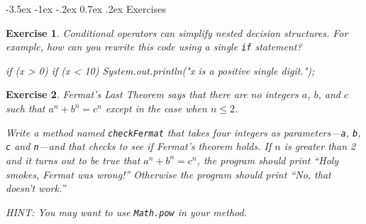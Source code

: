 \documentclass[12pt]{book}
\makeatletter
\theoremstyle{exercise}
\newtheorem{exercise}{Exercise}[chapter]
\newcommand{\java}[1]{\verb"#1"}
\renewcommand{\section}{\@startsection{section}{1}{\z@}%
    {-3.5ex \@plus -1ex \@minus -.2ex}%
    {0.7ex \@plus.2ex}%
    {\normalfont\Large\bfseries}}
\newcommand{\java}[1]{\lstinline{#1}} %
\makeatother
\begin{document}
\section{Exercises}


\begin{exercise}

Conditional operators can simplify nested decision structures.
For example, how can you rewrite this code using a single \java{if} statement?

\begin{code}
    if (x > 0) {
        if (x < 10) {
            System.out.println("x is a positive single digit.");
        }
    }
\end{code}

\end{exercise}


\begin{exercise}

Fermat's Last Theorem says that there are no integers $a$, $b$, and $c$ such that $a^n + b^n = c^n$ except in the case when $n \leq 2$.

Write a method named \java{checkFermat} that takes four integers as parameters---\java{a}, \java{b}, \java{c} and \java{n}---and that checks to see if Fermat's theorem holds.
If $n$ is greater than 2 and it turns out to be true that $a^n + b^n = c^n$, the program should print ``Holy smokes, Fermat was wrong!''
Otherwise the program should print ``No, that doesn't work.''

HINT: You may want to use \java{Math.pow} in your method.

\end{exercise}
\end{document}
